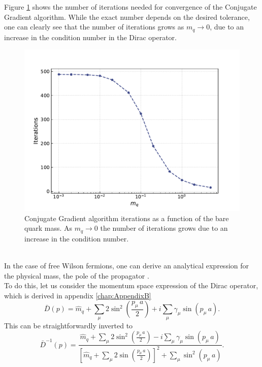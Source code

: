 Figure \ref{fig:correlator_CGiter} shows the number of iterations needed for convergence of the Conjugate Gradient algorithm. While the exact number depends on the desired tolerance, one can clearly see that the number of iterations grows as $m_q \to 0$, due to an increase in the condition number \cite{cond_num_ref} in the Dirac operator. \\
\begin{figure}[h!]
    \centering 
    \includegraphics[scale=0.6]{figures/correlator/CGiter.pdf}
    \caption[Conjugate Gradient algorithm iterations as a function of the bare quark mass.]{Conjugate Gradient algorithm iterations as a function of the bare quark mass. As $m_q \to 0$ the number of iterations grows due to an increase in the condition number.}
    \label{fig:correlator_CGiter}
\end{figure} \\
In the case of free Wilson fermions, one can derive an analytical expression for the physical mass, the pole of the propagator \cite{Montvay1994QuantumLattice}. \\
To do this, let us consider the momentum space expression of the Dirac operator, which is derived in appendix \ref{chap:AppendixB}
\begin{equation*}
\bar{D}(p)= \hat{m}_q + \sum_\mu 2 \sin ^2\left(\frac{p_\mu \, a}{2}\right)+i \sum_\mu \gamma_\mu \sin \left(p_\mu \, a\right).
\end{equation*}
This can be straightforwardly inverted to
\begin{equation*}
    \bar{D}^{-1}(p) = \frac{\hat{m}_q + \sum_\mu 2 \sin ^2\left(\frac{p_\mu \, a}{2}\right) - i \sum_\mu \gamma_\mu \sin \left(p_\mu \, a\right)}{\left[\hat{m}_q + \sum_\mu 2 \sin\left(\frac{p_\mu \, a}{2}\right)\right]^2 + \sum_\mu \sin^2 \left(p_\mu \, a\right)}.
\end{equation*}
